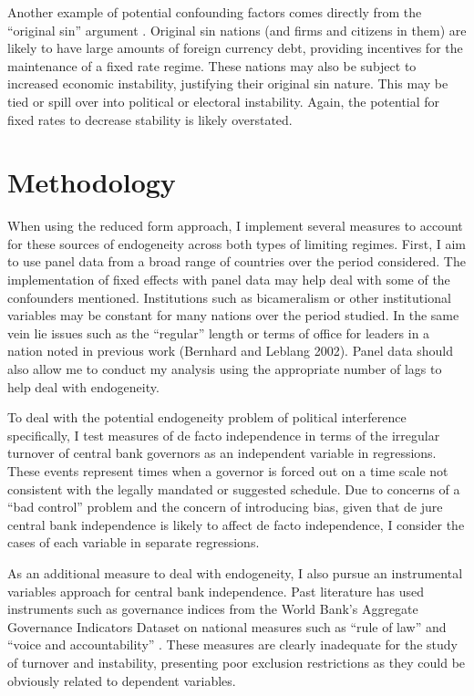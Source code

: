 \documentclass{article}
\begin{document}
    Another example of potential confounding factors comes directly from the “original sin” argument \citep{eichengreen_other_2005}. Original sin nations (and firms and citizens in them) are likely to have large amounts of foreign currency debt, providing incentives for the maintenance of a fixed rate regime. These nations may also be subject to increased economic instability, justifying their original sin nature. This may be tied or spill over into political or electoral instability. Again, the potential for fixed rates to decrease stability is likely overstated.
    
    \section*{Methodology}

    When using the reduced form approach, I implement several measures to account for these sources of endogeneity across both types of limiting regimes. First, I aim to use panel data from a broad range of countries over the period considered. The implementation of fixed effects with panel data may help deal with some of the confounders mentioned. Institutions such as bicameralism or other institutional variables may be constant for many nations over the period studied. In the same vein lie issues such as the “regular” length or terms of office for leaders in a nation noted in previous work \citep{bernhard_political_2002-1} (Bernhard and Leblang 2002). Panel data should also allow me to conduct my analysis using the appropriate number of lags to help deal with endogeneity.

    To deal with the potential endogeneity problem of political interference specifically, I test measures of de facto independence in terms of the irregular turnover of central bank governors as an independent variable in regressions. These events represent times when a governor is forced out on a time scale not consistent with the legally mandated or suggested schedule. Due to concerns of a “bad control” problem and the concern of introducing bias, given that de jure central bank independence is likely to affect de facto independence, I consider the cases of each variable in separate regressions.

    As an additional measure to deal with endogeneity, I also pursue an instrumental variables approach for central bank independence. Past literature has used instruments such as governance indices from the World Bank’s Aggregate Governance Indicators Dataset on national measures such as “rule of law” and “voice and accountability” \citep{crowe_central_2008}. These measures are clearly inadequate for the study of turnover and instability, presenting poor exclusion restrictions as they could be obviously related to dependent variables. 
\end{document}
